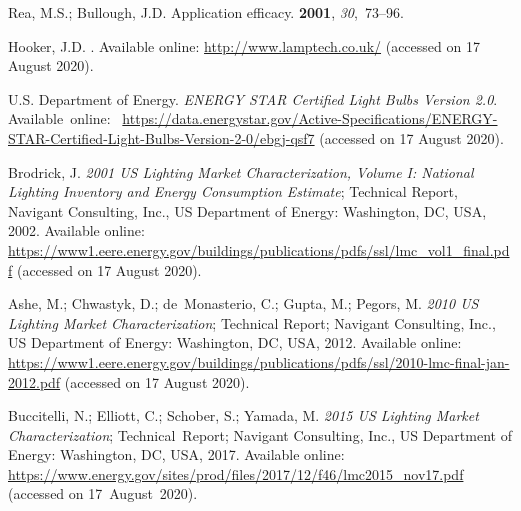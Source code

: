 \documentclass[energies,article,accept,moreauthors,pdftex]{Definitions/mdpi}\usepackage[]{graphicx}\usepackage[]{color}
\begin{document}
\begin{thebibliography}{999}
Rea, M.S.; Bullough, J.D.
\newblock Application efficacy.
 {\bf 2001},
  {\em 30},~73--96.%

Hooker, J.D.
.  Available online: 
\newblock \url{http://www.lamptech.co.uk/}
\newblock (accessed on 17 August 2020).%

{U.S. Department of Energy}.
\newblock \emph{ENERGY STAR Certified Light Bulbs Version 2.0}.
\newblock
  \mbox{Available online: } \url{https://data.energystar.gov/Active-Specifications/ENERGY-STAR-Certified-Light-Bulbs-Version-2-0/ebgj-qsf7}
\newblock (accessed on 17 August 2020).%

Brodrick, J.
\newblock \emph{2001 {US} Lighting Market Characterization, {V}olume {I}:
  National Lighting Inventory and Energy Consumption Estimate};
\newblock Technical Report, Navigant Consulting, Inc., US Department of Energy:
  Washington, DC, USA,  2002.  Available online: 
  \url{https://www1.eere.energy.gov/buildings/publications/pdfs/ssl/lmc_vol1_final.pdf}
\newblock (accessed on 17 August 2020).%

Ashe, M.; Chwastyk, D.; de~Monasterio, C.; Gupta, M.; Pegors, M.
\newblock \emph{2010 {US} Lighting Market Characterization};
\newblock Technical Report; Navigant Consulting, Inc., US Department of Energy:
  Washington, DC, USA,  2012.  Available online: 
  \url{https://www1.eere.energy.gov/buildings/publications/pdfs/ssl/2010-lmc-final-jan-2012.pdf}
\newblock (accessed on 17 August 2020).%

Buccitelli, N.; Elliott, C.; Schober, S.; Yamada, M.
\newblock \emph{2015 {US} Lighting Market Characterization};
\newblock \mbox{Technical Report}; Navigant Consulting, Inc., US Department of Energy:
  Washington, DC, USA,  2017.  Available online: 
  \url{https://www.energy.gov/sites/prod/files/2017/12/f46/lmc2015_nov17.pdf}
\newblock (accessed on \mbox{17 August 2020}).%



\end{thebibliography}
\end{document}
